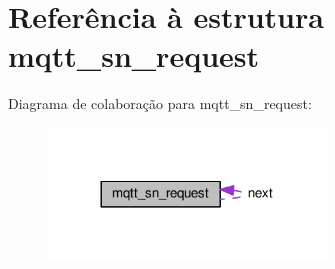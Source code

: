 \hypertarget{structmqtt__sn__request}{\section{Referência à estrutura mqtt\+\_\+sn\+\_\+request}
\label{structmqtt__sn__request}
}


Diagrama de colaboração para mqtt\+\_\+sn\+\_\+request\+:\nopagebreak
\begin{figure}[H]
\begin{center}
\leavevmode
\includegraphics[width=209pt]{structmqtt__sn__request__coll__graph}
\end{center}
\end{figure}
